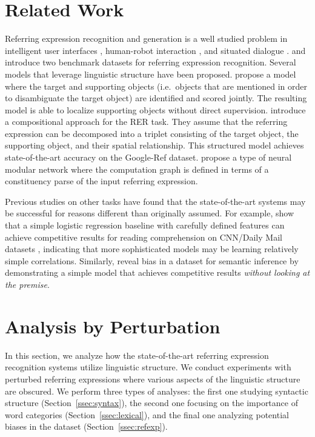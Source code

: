 \documentclass[11pt,a4paper]{article}
\begin{document}
\section{Related Work}\label{sec:related}
\vspace{-5pt}
Referring expression recognition and generation is a well studied problem in intelligent user interfaces \cite{chai2004probabilistic}, human-robot interaction \cite{fang2012integrating,chai2014collaborative, williams2016situated}, and situated dialogue \cite{kennington2017simple}.
\citet{KazemzadehOrdonezMattenBergEMNLP14} and \citet{mao2016generation} introduce two benchmark datasets for referring expression recognition.
Several models that leverage linguistic structure have been proposed. \citet{nagaraja16refexp} propose a model where the target and supporting objects (i.e.~objects that are mentioned in order to disambiguate the target object) are identified and scored jointly. The resulting model is able to localize supporting objects without direct supervision.
\citet{hu2017modeling} introduce a compositional approach for the RER task. They assume that the referring expression can be decomposed into a triplet consisting of the target object, the supporting object, and their spatial relationship. This structured model achieves state-of-the-art accuracy on the Google-Ref dataset. \citet{cirik2018using} propose a type of neural modular network \cite{andreas2016neural} where the computation graph is defined in terms of a constituency parse of the input referring expression. 

Previous studies on other tasks have found that the state-of-the-art systems may be successful for reasons different than originally assumed. For example, \citet{chen2016} show that a simple logistic regression baseline with carefully defined features can achieve competitive results for reading comprehension on CNN/Daily Mail datasets \cite{hermann2015teaching}, indicating that more sophisticated models may be learning relatively simple correlations.
Similarly, \citet{gururangan2018annotation} reveal bias in a dataset for semantic inference by demonstrating a simple model that achieves competitive results \textit{without looking at the premise}.
\figurethree
\vspace{-5pt}
\section{Analysis by Perturbation}\label{sec:analysis}
\vspace{-5pt}
In this section, we analyze how the state-of-the-art referring expression recognition systems utilize linguistic structure.
We conduct experiments with perturbed referring expressions where various aspects of the linguistic structure are obscured.
We perform three types of analyses: the first one studying syntactic structure (Section~\ref{ssec:syntax}), the second one focusing on the importance of word categories (Section~\ref{ssec:lexical}), and the final one analyzing potential biases in the dataset (Section~\ref{ssec:refexp}).
\end{document}
